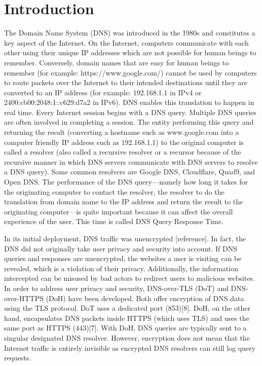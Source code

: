 \section{Introduction}\label{sec:intro}

The Domain Name System (DNS) was introduced in the 1980s and constitutes a key aspect of the Internet.
On the Internet, computers communicate with each other using their unique IP addresses which are not possible for human beings to remember. Conversely, domain names that are easy for human beings to remember (for example: https://www.google.com/) cannot be used by computers to route packets over the Internet to their intended destinations until they are converted to an IP address (for example: 192.168.1.1 in IPv4 or 2400:cb00:2048:1::c629:d7a2 in IPv6).
DNS enables this translation to happen in real time.
Every Internet session begins with a DNS query.
Multiple DNS queries are often involved in completing a session.
The entity performing this query and returning the result (converting a hostname such as www.google.com into a computer friendly IP address such as 192.168.1.1) to the original computer is called a resolver (also called a recursive resolver or a recursor because of the recursive manner in which DNS servers communicate with DNS servers to resolve a DNS query).
Some common resolvers are Google DNS, Cloudflare, Quad9, and Open DNS.
The performance of the DNS query—namely how long it takes for the originating computer to contact the resolver, the resolver to do the translation from domain name to the IP address and return the result to the originating computer—is quite important because it can affect the overall experience of the user.
This time is called DNS Query Response Time.

In its initial deployment, DNS traffic was unencrypted [reference].
In fact, the DNS did not originally take user privacy and security into account.
If DNS queries and responses are unencrypted, the websites a user is visiting can be revealed, which is a violation of their privacy.
Additionally, the information intercepted can be misused by bad actors to redirect users to malicious websites.
In order to address user privacy and security, DNS-over-TLS (DoT) and DNS-over-HTTPS (DoH) have been developed.
Both offer encryption of DNS data using the TLS protocol.
DoT uses a dedicated port (853)[8].
DoH, on the other hand, encapsulates DNS packets inside HTTPS (which uses TLS) and uses the same port as HTTPS (443)[7].
With DoH, DNS queries are typically sent to a singular designated DNS resolver.
However, encryption does not mean that the Internet traffic is entirely invisible as encrypted DNS resolvers can still log query requests.

